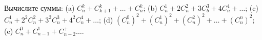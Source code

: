 Вычислите суммы: (a) $C_n^k + C_{k+1}^k + \ldots + C_n^k$; (b) $C_n^1 + 2 C_n^2 + 3 C_b^3 + 4 C_n^4 + \ldots$; (c) $C_n^1 + 2^2 C_n^2 + 3^2 C_n^3 + 4^2 C_n^4 + \ldots$; (d) $(C_n^0)^2 + (C_n^1)^2 + (C_n^2)^2 + \ldots + (C_n^n)^2$; (e) $C_n^0 + C_{n-1}^1 + C_{n-2}^ + \ldots$.